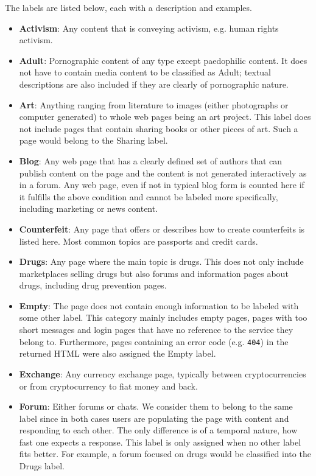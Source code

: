 The labels are listed below, each with a description and examples.
\begin{itemize}
	\item \textbf{Activism}: Any content that is conveying activism, e.g. human rights activism.
	\item \textbf{Adult}: Pornographic content of any type except paedophilic content. It does not have to contain media content to be classified as Adult; textual descriptions  are also included if they are clearly of pornographic nature.
	\item \textbf{Art}: Anything ranging from literature to images (either photographs or computer generated) to whole web pages being an art project. This label does not include pages that contain sharing books or other pieces of art. Such a page would belong to the Sharing label.
	\item \textbf{Blog}: Any web page that has a clearly defined set of authors that can publish content on the page and the content is not generated interactively as in a forum. Any web page, even if not in typical blog form is counted here if it fulfills the above condition and cannot be labeled more specifically, 
	including marketing or news content.
	\item \textbf{Counterfeit}: Any page that offers or describes how to create counterfeits is listed here. Most common topics are passports and credit cards.
	\item \textbf{Drugs}: Any page where the main topic is drugs. This does not only include marketplaces selling drugs but also forums and information pages about drugs, including drug prevention pages.
	\item \textbf{Empty}: The page does not contain enough information to be labeled with some other label. This category mainly includes empty pages, pages with too short messages and login pages that have no reference to the service they belong to. Furthermore, pages containing an error code (e.g. \texttt{404}) in the returned HTML were also assigned the Empty label.
	\item \textbf{Exchange}: Any currency exchange page, typically between cryptocurrencies or from cryptocurrency to fiat money and back.
	\item \textbf{Forum}: Either forums or chats. We consider them to belong to the same label since in both cases users are populating the page with content and responding to each other. The only difference is of a temporal nature, how fast one expects a response. This label is only assigned when no other label fits better. For example, a forum focused on drugs would be classified into the Drugs label.

\end{itemize}
